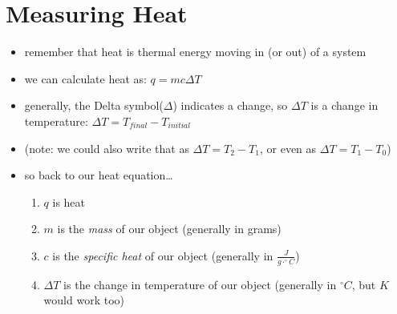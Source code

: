 \documentclass[11pt, oneside]{article}   	%
\begin{document}
\section{Measuring Heat}
\begin{itemize}
\item remember that heat is thermal energy moving in (or out) of a system
\item we can calculate heat as: $q = m c \Delta T$
\item generally, the Delta symbol($\Delta$) indicates a change, so $\Delta T$ is a change in temperature: $\Delta T = T_{final} - T_{initial}$
\item (note: we could also write that as $\Delta T = T_2 - T_1$, or even as $\Delta T = T_1 - T_0$)
\item so back to our heat equation\ldots
\begin{enumerate}
\item $q$ is heat
\item $m$ is the \emph{mass} of our object (generally in grams)
\item $c$ is the \emph{specific heat} of our object (generally in $\frac{J}{g \cdot ^{\circ}C}$)
\item $\Delta T$ is the change in temperature of our object (generally in $^{\circ}C$, but $K$ would work too)
\end{enumerate}
\end{itemize}
\end{document}
